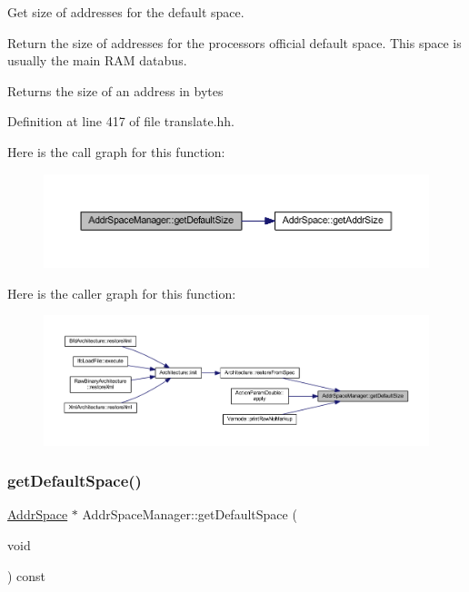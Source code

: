 Get size of addresses for the default space. 

Return the size of addresses for the processor\textquotesingle{}s official default space. This space is usually the main R\+AM databus. \begin{DoxyReturn}{Returns}
the size of an address in bytes 
\end{DoxyReturn}


Definition at line 417 of file translate.\+hh.

Here is the call graph for this function\+:
\nopagebreak
\begin{figure}[H]
\begin{center}
\leavevmode
\includegraphics[width=350pt]{class_addr_space_manager_ab1b808345dc85dc7e4f8e993fd739f96_cgraph}
\end{center}
\end{figure}
Here is the caller graph for this function\+:
\nopagebreak
\begin{figure}[H]
\begin{center}
\leavevmode
\includegraphics[width=350pt]{class_addr_space_manager_ab1b808345dc85dc7e4f8e993fd739f96_icgraph}
\end{center}
\end{figure}
\mbox{\label{class_addr_space_manager_aec65c9fb56f10199463c70d5b6660b3f}} 
\subsubsection{\texorpdfstring{getDefaultSpace()}{getDefaultSpace()}}
{\footnotesize\ttfamily \mbox{\hyperlink{class_addr_space}{Addr\+Space}} $\ast$ Addr\+Space\+Manager\+::get\+Default\+Space (\begin{DoxyParamCaption}\item[{void}]{ }\end{DoxyParamCaption}) const\hspace{0.3cm}{\ttfamily [inline]}}



